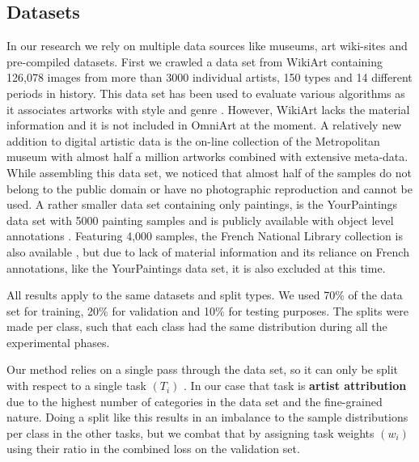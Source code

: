 \documentclass[sigconf]{acmart}
\begin{document}
\subsection{Datasets}
In our research we rely on multiple data sources like museums, art wiki-sites and pre-compiled datasets. First we crawled a data set from WikiArt containing 126,078 images from more than 3000 individual artists, 150 types and 14 different periods in history. This data set has been used to evaluate various algorithms as it associates artworks with style and genre \cite{bar2014classification, elgammal2015quantifying, karayev2013recognizing, saleh2015large}. However, WikiArt lacks the material information and it is not included in OmniArt at the moment. A relatively new addition to digital artistic data is the on-line collection of the Metropolitan museum with almost half a million artworks combined with extensive meta-data. While assembling this data set, we noticed that almost half of the samples do not belong to the public domain or have no photographic reproduction and cannot be used. A rather smaller data set containing only paintings, is the YourPaintings data set with 5000 painting samples and is publicly available with object level annotations \cite{crowley2014search, kaufmann2004toward}. Featuring 4,000 samples, the French National Library collection is also available \cite{simon2014europeanatech}, but due to lack of material information and its reliance on French annotations, like the YourPaintings data set, it is also excluded at this time.

All results apply to the same datasets and split types. We used 70\% of the data set for training, 20\% for validation and 10\% for testing purposes. The splits were made per class, such that each class had the same distribution during all the experimental phases. 

Our method relies on a single pass through the data set, so it can only be split with respect to a single task 
\begin{math}
(T_{i})
\end{math}
. In our case that task is \textbf{artist attribution} due to the highest number of categories in the data set and the fine-grained nature. Doing a split like this results in an imbalance to the sample distributions per class in the other tasks, but we combat that by assigning task weights
\begin{math}
(w_{i})
\end{math}
using their ratio in the combined loss on the validation set. 
\end{document}
